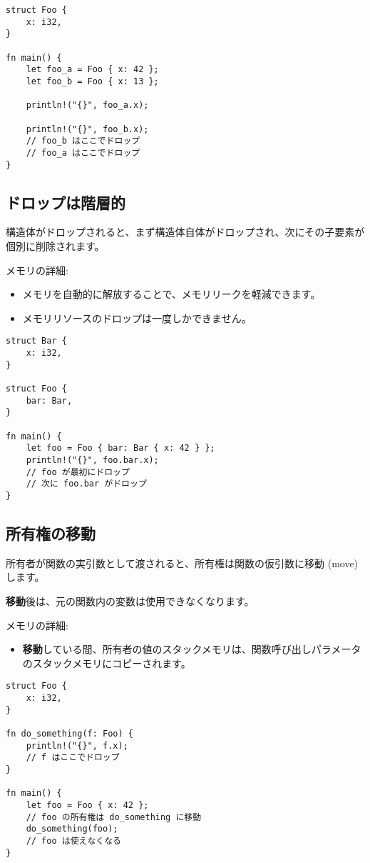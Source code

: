 \begin{verbatim}
struct Foo {
    x: i32,
}

fn main() {
    let foo_a = Foo { x: 42 };
    let foo_b = Foo { x: 13 };

    println!("{}", foo_a.x);

    println!("{}", foo_b.x);
    // foo_b はここでドロップ
    // foo_a はここでドロップ
}
\end{verbatim}

\subsection{ドロップは階層的}

構造体がドロップされると、まず構造体自体がドロップされ、次にその子要素が個別に削除されます。

メモリの詳細:

\begin{itemize}
\item
  メモリを自動的に解放することで、メモリリークを軽減できます。
\item
  メモリリソースのドロップは一度しかできません。
\end{itemize}

\begin{verbatim}
struct Bar {
    x: i32,
}

struct Foo {
    bar: Bar,
}

fn main() {
    let foo = Foo { bar: Bar { x: 42 } };
    println!("{}", foo.bar.x);
    // foo が最初にドロップ
    // 次に foo.bar がドロップ
}
\end{verbatim}

\subsection{所有権の移動}

所有者が関数の実引数として渡されると、所有権は関数の仮引数に移動 (move)
します。

\textbf{移動}後は、元の関数内の変数は使用できなくなります。

メモリの詳細:

\begin{itemize}
\item
  \textbf{移動}している間、所有者の値のスタックメモリは、関数呼び出しパラメータのスタックメモリにコピーされます。
\end{itemize}

\begin{verbatim}
struct Foo {
    x: i32,
}

fn do_something(f: Foo) {
    println!("{}", f.x);
    // f はここでドロップ
}

fn main() {
    let foo = Foo { x: 42 };
    // foo の所有権は do_something に移動
    do_something(foo);
    // foo は使えなくなる
}
\end{verbatim}

